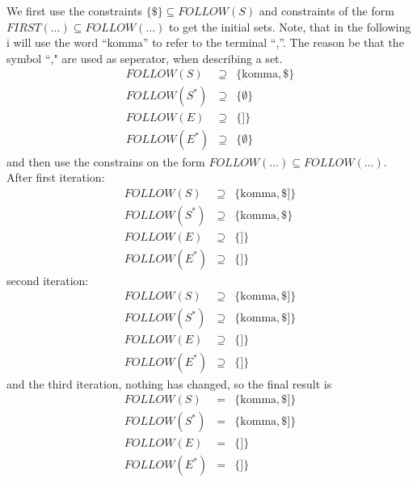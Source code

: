 \documentclass[11pt,a4paper]{article}
\begin{document}
We first use the constraints $ \{\$\} \subseteq FOLLOW(S)$ and constraints
of the form $FIRST(\dots)\subseteq FOLLOW(\dots)$ to get the initial sets.
Note, that in the following i will use the word ``komma'' to refer to the
terminal ``,''. The reason be that the symbol ``," are used as seperator, when
describing a set.
\begin{eqnarray*}
    FOLLOW(S)       & \supseteq & \{\mathrm{komma, \$} \} \\
    FOLLOW(S^{*})   & \supseteq & \{\emptyset\} \\
    FOLLOW(E)       & \supseteq & \{\mathrm{]}\} \\
    FOLLOW(E^{*})   & \supseteq & \{\emptyset\}
\end{eqnarray*}
and then use the constrains on the form $FOLLOW(\dots)\subseteq FOLLOW(\dots)$. After first iteration:
\begin{eqnarray*}
    FOLLOW(S)       & \supseteq & \{\mathrm{komma,\$]}\} \\
    FOLLOW(S^{*})   & \supseteq & \{\mathrm{komma, \$}\} \\
    FOLLOW(E)       & \supseteq & \{\mathrm{]}\} \\
    FOLLOW(E^{*})   & \supseteq & \{\mathrm{]}\}
\end{eqnarray*}
second iteration:
\begin{eqnarray*}
    FOLLOW(S)       & \supseteq & \{\mathrm{komma,\$]}\} \\
    FOLLOW(S^{*})   & \supseteq & \{\mathrm{komma,\$]}\} \\
    FOLLOW(E)       & \supseteq & \{\mathrm{]}\} \\
    FOLLOW(E^{*})   & \supseteq & \{\mathrm{]}\}
\end{eqnarray*}
and the third iteration, nothing has changed, so the final result is
\begin{eqnarray*}
    FOLLOW(S)       & =         & \{\mathrm{komma,\$]}\} \\
    FOLLOW(S^{*})   & =         & \{\mathrm{komma,\$]}\} \\
    FOLLOW(E)       & =         & \{\mathrm{]}\} \\
    FOLLOW(E^{*})   & =         & \{\mathrm{]}\}
\end{eqnarray*}
\end{document}
